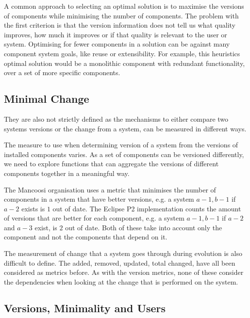 A common approach to selecting an optimal solution is to
maximise the versions of components while minimising the number of components.
The problem with the first criterion is that the version information does not tell us what quality improves, 
how much it improves or if that quality is relevant to the user or system.
Optimising for fewer components in a solution can be against many component system goals, like reuse or extensibility.
For example, this heuristics optimal solution would be a monolithic component with redundant functionality, over 
a set of more specific components. 

\subsection{Minimal Change}
They are also not strictly defined as the mechanisms to either compare two systems versions or the change from a system,
can be measured in different ways.

The measure to use when determining version of a system from the versions of installed components varies.
As a set of components can be versioned differently, 
we need to explore functions that can aggregate the versions of different components together in a meaningful way.

The Mancoosi organisation uses a metric that minimises the number of components in a system that have better versions, 
e.g. a system $a-1,b-1$ if $a-2$ exists is $1$ out of date. 
The Eclipse P2 implementation counts the amount of versions that are better for each component,
e.g. a system $a-1,b-1$ if $a-2$ and $a-3$ exist, is $2$ out of date.
Both of these take into account only the component and not the components that depend on it.

The measurement of change that a system goes through during evolution is also difficult to define.
The added, removed, updated, total changed, have all been considered as metrics before. 
As with the version metrics, none of these consider the dependencies when looking at the change that is performed on the system.

\subsection{Versions, Minimality and Users}

